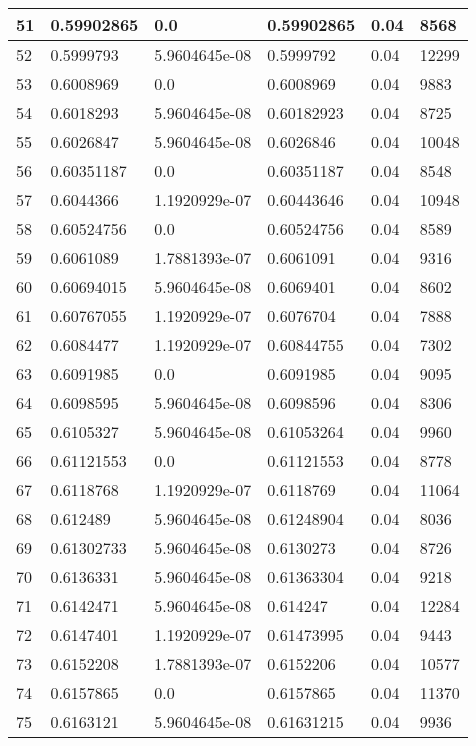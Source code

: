 \begin{longtable}{|l|l|l|l|l|l|}
51 & 0.59902865 & 0.0 & 0.59902865 & 0.04 & 8568 \\ \hline 
52 & 0.5999793 & 5.9604645e-08 & 0.5999792 & 0.04 & 12299 \\ \hline 
53 & 0.6008969 & 0.0 & 0.6008969 & 0.04 & 9883 \\ \hline 
54 & 0.6018293 & 5.9604645e-08 & 0.60182923 & 0.04 & 8725 \\ \hline 
55 & 0.6026847 & 5.9604645e-08 & 0.6026846 & 0.04 & 10048 \\ \hline 
56 & 0.60351187 & 0.0 & 0.60351187 & 0.04 & 8548 \\ \hline 
57 & 0.6044366 & 1.1920929e-07 & 0.60443646 & 0.04 & 10948 \\ \hline 
58 & 0.60524756 & 0.0 & 0.60524756 & 0.04 & 8589 \\ \hline 
59 & 0.6061089 & 1.7881393e-07 & 0.6061091 & 0.04 & 9316 \\ \hline 
60 & 0.60694015 & 5.9604645e-08 & 0.6069401 & 0.04 & 8602 \\ \hline 
61 & 0.60767055 & 1.1920929e-07 & 0.6076704 & 0.04 & 7888 \\ \hline 
62 & 0.6084477 & 1.1920929e-07 & 0.60844755 & 0.04 & 7302 \\ \hline 
63 & 0.6091985 & 0.0 & 0.6091985 & 0.04 & 9095 \\ \hline 
64 & 0.6098595 & 5.9604645e-08 & 0.6098596 & 0.04 & 8306 \\ \hline 
65 & 0.6105327 & 5.9604645e-08 & 0.61053264 & 0.04 & 9960 \\ \hline 
66 & 0.61121553 & 0.0 & 0.61121553 & 0.04 & 8778 \\ \hline 
67 & 0.6118768 & 1.1920929e-07 & 0.6118769 & 0.04 & 11064 \\ \hline 
68 & 0.612489 & 5.9604645e-08 & 0.61248904 & 0.04 & 8036 \\ \hline 
69 & 0.61302733 & 5.9604645e-08 & 0.6130273 & 0.04 & 8726 \\ \hline 
70 & 0.6136331 & 5.9604645e-08 & 0.61363304 & 0.04 & 9218 \\ \hline 
71 & 0.6142471 & 5.9604645e-08 & 0.614247 & 0.04 & 12284 \\ \hline 
72 & 0.6147401 & 1.1920929e-07 & 0.61473995 & 0.04 & 9443 \\ \hline 
73 & 0.6152208 & 1.7881393e-07 & 0.6152206 & 0.04 & 10577 \\ \hline 
74 & 0.6157865 & 0.0 & 0.6157865 & 0.04 & 11370 \\ \hline 
75 & 0.6163121 & 5.9604645e-08 & 0.61631215 & 0.04 & 9936 \\ \hline 
\end{longtable}